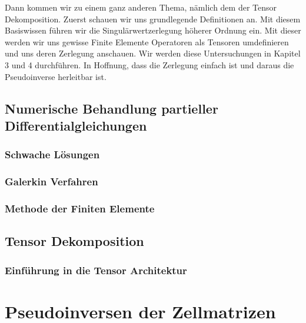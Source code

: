 \documentclass[12pt,a4paper]{scrartcl}
\numberwithin{equation}{section}
\begin{document}
Dann kommen wir zu einem ganz anderen Thema, nämlich dem der Tensor Dekomposition. 
Zuerst schauen wir uns grundlegende Definitionen an. Mit diesem Basiswissen führen wir die Singulärwertzerlegung höherer Ordnung ein. Mit dieser werden wir uns gewisse Finite Elemente Operatoren als Tensoren umdefinieren und uns deren Zerlegung anschauen. Wir werden diese Untersuchungen in Kapitel 3 und 4 durchführen. In Hoffnung, dass die Zerlegung einfach ist und daraus die Pseudoinverse herleitbar ist.


\subsection{Numerische Behandlung partieller Differentialgleichungen}
\subsubsection{Schwache Lösungen}


\subsubsection{Galerkin Verfahren}


\subsubsection{Methode der Finiten Elemente}


%

\newpage
\subsection{Tensor Dekomposition}
\subsubsection{Einführung in die Tensor Architektur}




\newpage
\section{Pseudoinversen der Zellmatrizen}
\end{document}
